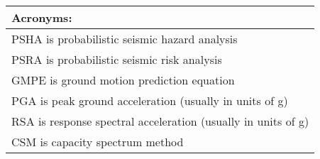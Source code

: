 \documentclass[a4paper, 12pt]{report}
\begin{document}
\vspace{2em}

\begin{tabular}{l}
\hline
\textbf{Acronyms}: \\
\hline
PSHA is probabilistic seismic hazard analysis \\
PSRA is probabilistic seismic risk analysis  \\
GMPE is ground motion prediction equation \\
PGA is peak ground acceleration (usually in units of g) \\
RSA is response spectral acceleration (usually in units of g) \\
CSM is capacity spectrum method \\
\hline
\end{tabular}
\end{document}
